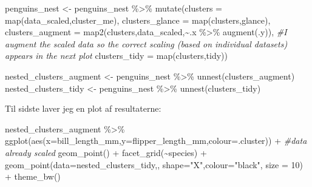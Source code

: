 \documentclass[
]{book}
\newenvironment{Shaded}{\begin{snugshade}}{\end{snugshade}}
\newcommand{\AttributeTok}[1]{\textcolor[rgb]{0.77,0.63,0.00}{#1}}
\newcommand{\CommentTok}[1]{\textcolor[rgb]{0.56,0.35,0.01}{\textit{#1}}}
\newcommand{\DecValTok}[1]{\textcolor[rgb]{0.00,0.00,0.81}{#1}}
\newcommand{\FunctionTok}[1]{\textcolor[rgb]{0.00,0.00,0.00}{#1}}
\newcommand{\NormalTok}[1]{#1}
\newcommand{\OtherTok}[1]{\textcolor[rgb]{0.56,0.35,0.01}{#1}}
\newcommand{\SpecialCharTok}[1]{\textcolor[rgb]{0.00,0.00,0.00}{#1}}
\newcommand{\StringTok}[1]{\textcolor[rgb]{0.31,0.60,0.02}{#1}}
\begin{document}
\begin{Shaded}
\begin{Highlighting}[]
\NormalTok{penguins\_nest }\OtherTok{\textless{}{-}}\NormalTok{ penguins\_nest }\SpecialCharTok{\%\textgreater{}\%} 
  \FunctionTok{mutate}\NormalTok{(}\AttributeTok{clusters =} \FunctionTok{map}\NormalTok{(data\_scaled,cluster\_me),}
         \AttributeTok{clusters\_glance =} \FunctionTok{map}\NormalTok{(clusters,glance),}
         \AttributeTok{clusters\_augment =} \FunctionTok{map2}\NormalTok{(clusters,data\_scaled,}\SpecialCharTok{\textasciitilde{}}\NormalTok{.x }\SpecialCharTok{\%\textgreater{}\%} \FunctionTok{augment}\NormalTok{(.y)), }\CommentTok{\#I augment the scaled data so the correct scaling (based on individual datasets) appears in the next plot}
         \AttributeTok{clusters\_tidy =} \FunctionTok{map}\NormalTok{(clusters,tidy))}

\NormalTok{nested\_clusters\_augment }\OtherTok{\textless{}{-}}\NormalTok{ penguins\_nest }\SpecialCharTok{\%\textgreater{}\%} \FunctionTok{unnest}\NormalTok{(clusters\_augment)}
\NormalTok{nested\_clusters\_tidy }\OtherTok{\textless{}{-}}\NormalTok{ penguins\_nest }\SpecialCharTok{\%\textgreater{}\%} \FunctionTok{unnest}\NormalTok{(clusters\_tidy)}
\end{Highlighting}
\end{Shaded}

Til sidste laver jeg en plot af resultaterne:

\begin{Shaded}
\begin{Highlighting}[]
\NormalTok{nested\_clusters\_augment }\SpecialCharTok{\%\textgreater{}\%} 
  \FunctionTok{ggplot}\NormalTok{(}\FunctionTok{aes}\NormalTok{(}\AttributeTok{x=}\NormalTok{bill\_length\_mm,}\AttributeTok{y=}\NormalTok{flipper\_length\_mm,}\AttributeTok{colour=}\NormalTok{.cluster)) }\SpecialCharTok{+} \CommentTok{\#data already scaled}
  \FunctionTok{geom\_point}\NormalTok{() }\SpecialCharTok{+}
  \FunctionTok{facet\_grid}\NormalTok{(}\SpecialCharTok{\textasciitilde{}}\NormalTok{species) }\SpecialCharTok{+} 
  \FunctionTok{geom\_point}\NormalTok{(}\AttributeTok{data=}\NormalTok{nested\_clusters\_tidy,,}
             \AttributeTok{shape=}\StringTok{"X"}\NormalTok{,}\AttributeTok{colour=}\StringTok{"black"}\NormalTok{,}
             \AttributeTok{size =} \DecValTok{10}\NormalTok{) }\SpecialCharTok{+}
  \FunctionTok{theme\_bw}\NormalTok{()}
\end{Highlighting}
\end{Shaded}
\end{document}
